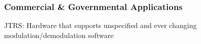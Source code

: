 \documentclass[
	11pt, %
]{beamer}
\begin{document}



\begin{frame}
  \frametitle{Commercial \& Governmental Applications}
  JTRS: Hardware that supports unspecified and ever changing modulation/demodulation software
  

\end{frame}
\end{document}
